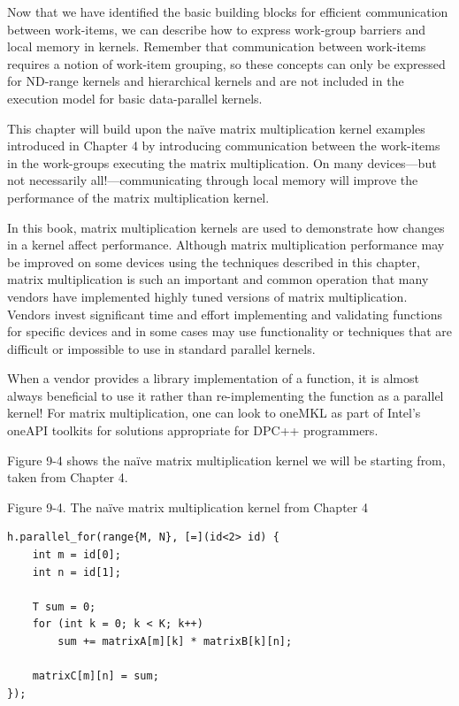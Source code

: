 Now that we have identified the basic building blocks for efficient communication between work-items, we can describe how to express work-group barriers and local memory in kernels. Remember that communication between work-items requires a notion of work-item grouping, so these concepts can only be expressed for ND-range kernels and hierarchical kernels and are not included in the execution model for basic data-parallel kernels.\par

This chapter will build upon the naïve matrix multiplication kernel examples introduced in Chapter 4 by introducing communication between the work-items in the work-groups executing the matrix multiplication. On many devices—but not necessarily all!—communicating through local memory will improve the performance of the matrix multiplication kernel.\par

\begin{tcolorbox}[colback=blue!5!white,colframe=blue!75!black, title=A NOTE ABOUT MATRIX MULTIPLICATION]
In this book, matrix multiplication kernels are used to demonstrate how changes in a kernel affect performance. Although matrix multiplication performance may be improved on some devices using the techniques described in this chapter, matrix multiplication is such an important and common operation that many vendors have implemented highly tuned versions of matrix multiplication. Vendors invest significant time and effort implementing and validating functions for specific devices and in some cases may use functionality or techniques that are difficult or impossible to use in standard parallel kernels.
\end{tcolorbox}

\begin{tcolorbox}[colback=blue!5!white,colframe=blue!75!black, title=USE VENDOR-PROVIDED LIBRARIES!]
When a vendor provides a library implementation of a function, it is almost always beneficial to use it rather than re-implementing the function as a parallel kernel! For matrix multiplication, one can look to oneMKL as part of Intel’s oneAPI toolkits for solutions appropriate for DPC++ programmers.
\end{tcolorbox}

Figure 9-4 shows the naïve matrix multiplication kernel we will be starting from, taken from Chapter 4.\par

\hspace*{\fill} \par %
Figure 9-4. The naïve matrix multiplication kernel from Chapter 4
\begin{lstlisting}[caption={}]
h.parallel_for(range{M, N}, [=](id<2> id) {
	int m = id[0];
	int n = id[1];
	
	T sum = 0;
	for (int k = 0; k < K; k++)
		sum += matrixA[m][k] * matrixB[k][n];
		
	matrixC[m][n] = sum;
});
\end{lstlisting}

